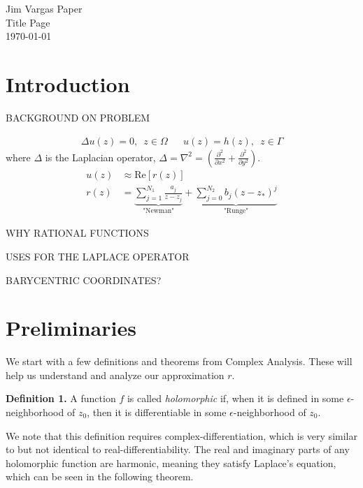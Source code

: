 \documentclass[12]{article}
\begin{document}
\begin{titlepage}
\begin{center}
\Huge
Jim Vargas Paper \\
Title Page \\
\today
\end{center}
\end{titlepage}

\tableofcontents \thispagestyle{empty}
\clearpage \setcounter{page}{1}


	\section{Introduction}
	
	BACKGROUND ON PROBLEM
	
	\begin{align*}
\Delta u(z) = 0,\enspace z\in \Omega &&
u(z)=h(z),\enspace z\in \Gamma
	\end{align*}
where $\Delta$ is the Laplacian operator, $\Delta = \nabla^2 = \left( \frac{\partial^2}{\partial x^2} + \frac{\partial^2}{\partial y^2}\right)$.
	\begin{align*}
u(z)&\approx \mathrm{Re}[r(z)] \\
r(z) &= \underbrace{\sum_{j=1}^{N_1} \frac{a_j}{z-z_j}}_\text{"Newman"} + \underbrace{\sum_{j=0}^{N_2} b_j (z-z_*)^j}_\text{"Runge"} 
	\end{align*}
	
	WHY RATIONAL FUNCTIONS
	
	USES FOR THE LAPLACE OPERATOR
	
	BARYCENTRIC COORDINATES?
	
	
	\section{Preliminaries}
	We start with a few definitions and theorems from Complex Analysis. These will help us understand and analyze our approximation $r$. 
	
	\textbf{Definition 1.} A function $f$ is called \textit{holomorphic} if, when it is defined in some $\epsilon$-neighborhood of $z_0$, then it is differentiable in some $\epsilon$-neighborhood of $z_0$. 
	
	We note that this definition requires complex-differentiation, which is very similar to but not identical to real-differentiability. The real and imaginary parts of any holomorphic function are harmonic, meaning they satisfy Laplace's equation, which can be seen in the following theorem. 
	
\end{document}
